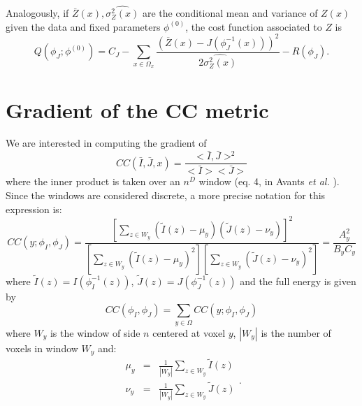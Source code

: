 Analogously, if $\overline{Z}(x), \widehat{\sigma^{2}_{Z}(x)}$ are the conditional mean and variance of $Z(x)$ given the data
and fixed parameters $\phi^{(0)}$, the cost function associated to $Z$ is
\begin{equation}
    Q(\phi_{J}; \phi^{(0)}) = C_{J} - \sum_{x\in\Omega_{x}}\frac{(\overline{Z}(x) - J(\phi^{-1}_{J}(x)))^{2}}{2\widehat{\sigma^{2}_{Z}(x)}} - R(\phi_{J}).
\end{equation}


\pagebreak
\section{Gradient of the CC metric}\label{ap:CC_gradient}
We are interested in computing the gradient of
\begin{equation}
    CC(\bar{I}, \bar{J}, x) = \frac{<\bar{I}, \bar{J}>^{2}}{<\bar{I}><\bar{J}>}
\end{equation}
where the inner product is taken over an $n^{D}$ window (eq. 4, in Avants {\it et al.} \cite{Avants2008}). Since the windows are considered discrete, a more precise notation
for this expression is:
\begin{equation}
    CC(y;\phi_{I}, \phi_{J}) = \frac{\left[\sum_{z\in W_{y}} \left(\tilde{I}(z) - \mu_{y}\right)\left(\tilde{J}(z) - \nu_{y}\right)\right]^{2}}
    {\left[\sum_{z \in W_{y}}\left(\tilde{I}(z) - \mu_{y}\right)^{2}\right] \left[\sum_{z \in W_{y}}\left(\tilde{J}(z) - \nu_{y}\right)^{2}\right]} = \frac{A_{y}^{2}}{B_{y}C_{y}}
\end{equation}
where $\tilde{I}(z) = I(\phi_{I}^{-1}(z))$, $\tilde{J}(z) = J(\phi_{J}^{-1}(z))$ and the full energy is given by
\begin{equation}
    CC(\phi_{I}, \phi_{J}) = \sum_{y\in\Omega} CC(y; \phi_{I}, \phi_{J})
\end{equation}
where $W_{y}$ is the window of side $n$ centered at voxel $y$, $|W_{y}|$ is the number of voxels in window $W_{y}$ and:
\begin{equation}
    \begin{array}{lll}
        \mu_{y} &=& \frac{1}{|W_{y}|}\sum_{z \in W_{y}}\tilde{I}(z)\\
        \nu_{y} &=& \frac{1}{|W_{y}|}\sum_{z \in W_{y}}\tilde{J}(z)\\
    \end{array}.
\end{equation}


